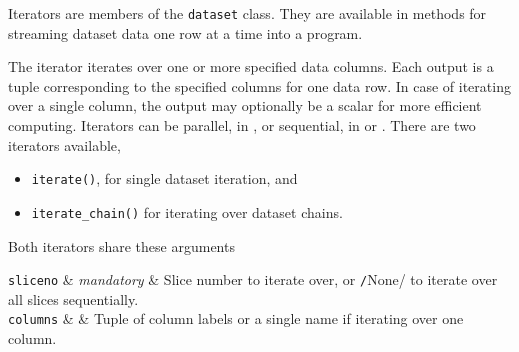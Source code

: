 
Iterators are members of the \texttt{dataset} class.  They are
available in methods for streaming dataset data one row at a time into
a program.

The iterator iterates over one or more specified data columns.  Each
output is a tuple corresponding to the specified columns for one data
row.  In case of iterating over a single column, the output may
optionally be a scalar for more efficient computing.  Iterators can be
parallel, in \analysis, or sequential, in \prepare or \synthesis.
There are two iterators available,
\begin{itemize}
\item [] \texttt{iterate()}, for  single dataset iteration, and
\item [] \texttt{iterate\_chain()} for iterating over dataset chains.
\end{itemize}
Both iterators share these arguments


\starttable
  \RP \texttt{sliceno} & \textsl{mandatory} & Slice number to iterate
  over, or \texttt/None/ to iterate over all slices
  sequentially. \\

  \RP \texttt{columns} & \pyNone & Tuple of column labels or a single name if
  iterating over one column.\\

